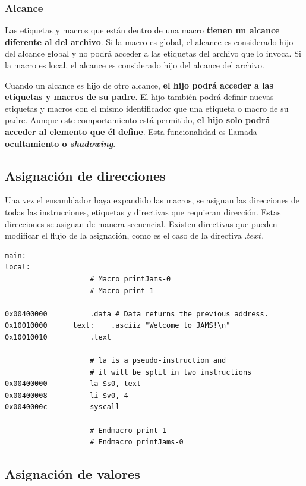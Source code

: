 \subsubsection{Alcance}\label{subsubsec:alcance}

Las etiquetas y macros que están dentro de una macro
\textbf{tienen un alcance diferente al del archivo}.
Si la macro es global, el alcance es considerado hijo del alcance global
y no podrá acceder a las etiquetas del archivo que lo invoca.
Si la macro es local, el alcance es considerado hijo del alcance del archivo.

Cuando un alcance es hijo de otro alcance,
\textbf{el hijo podrá acceder a las etiquetas y macros de su padre}.
El hijo también podrá definir nuevas etiquetas y macros con el mismo
identificador que una etiqueta o macro de su padre.
Aunque este comportamiento está permitido, \textbf{el hijo solo podrá acceder
al elemento que él define}.
Esta funcionalidad es llamada \textbf{ocultamiento o \textit{shadowing}}.

\subsection{Asignación de direcciones}\label{subsec:asignacion-de-direcciones}

Una vez el ensamblador haya expandido las macros,
se asignan las direcciones de todas las instrucciones,
etiquetas y directivas que requieran dirección.
Estas direcciones se asignan de manera secuencial.
Existen directivas que pueden modificar el flujo de la asignación,
como es el caso de la directiva $.text$.

\begin{lstlisting}[frame=single,label={lst:address-assignation}]
main:
local:
                    # Macro printJams-0
                    # Macro print-1

0x00400000          .data # Data returns the previous address.
0x10010000      text:    .asciiz "Welcome to JAMS!\n"
0x10010010          .text

                    # la is a pseudo-instruction and
                    # it will be split in two instructions
0x00400000          la $s0, text
0x00400008          li $v0, 4
0x0040000c          syscall

                    # Endmacro print-1
                    # Endmacro printJams-0
\end{lstlisting}

\subsection{Asignación de valores}\label{subsec:asignacion-de-valores}

